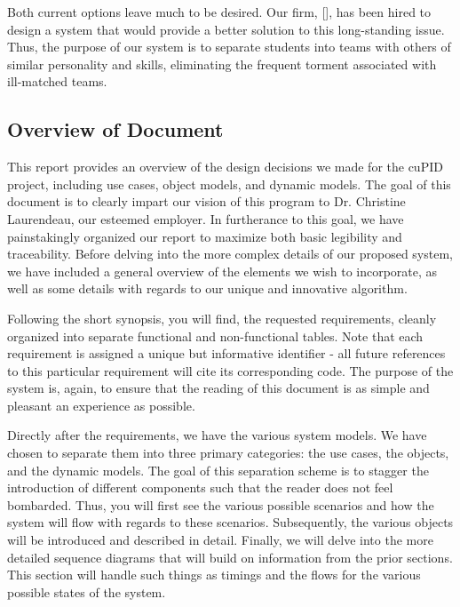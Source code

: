 \documentclass[12pt,letterpaper]{article}
\begin{document}
Both current options leave much to be desired. Our firm, [\teamname{}], has been hired
to design a system that would provide a better solution to this long-standing issue. Thus, the purpose of
our system is to separate students into teams with others of similar personality and skills, eliminating 
the frequent torment associated with ill-matched teams.

\subsection{Overview of Document}

This report provides an overview of the design decisions we made for the cuPID project, including 
use cases, object models, and dynamic models. The goal of this document is to clearly impart our vision of this
program to Dr. Christine Laurendeau, our esteemed employer. In furtherance to this goal, we have painstakingly 
organized our report to maximize both basic legibility and traceability. Before delving into the more complex details 
of our proposed system, we have included a general overview of the elements we wish to incorporate, as well as 
some details with regards to our unique and innovative algorithm.

Following the short synopsis, you will find, the requested requirements, cleanly organized into separate functional 
and non-functional tables. Note that each requirement is assigned a unique but informative identifier - all future references
to this particular requirement will cite its corresponding code. The purpose of the system is, again, to ensure that the
reading of this document is as simple and pleasant an experience as possible. 

Directly after the requirements, we have the various system models. We have chosen to separate them into three
primary categories: the use cases, the objects, and the dynamic models. The goal of this separation scheme is to
stagger the introduction of different components such that the reader does not feel bombarded. Thus, you will 
first see the various possible scenarios and how the system will flow with regards to these scenarios. Subsequently, 
the various objects will be introduced and described in detail. Finally, we will delve into the more detailed sequence 
diagrams that will build on information from the prior sections. This section will handle such things as timings and
the flows for the various possible states of the system.

\vspace{1em}
\end{document}
